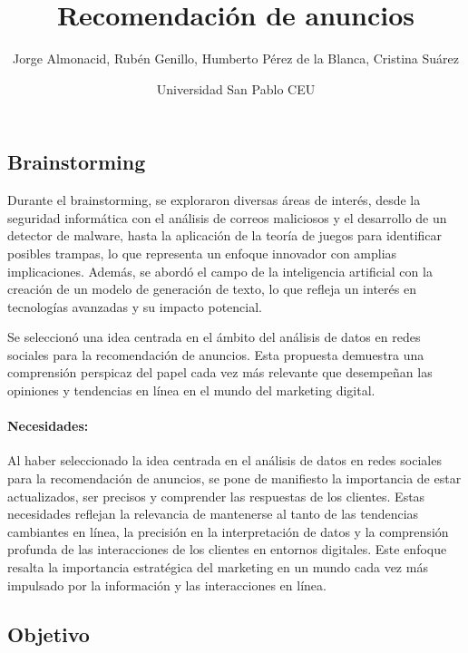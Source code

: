 \documentclass[
  letterpaper,
  DIV=11,
  numbers=noendperiod]{scrartcl}
\title{Recomendación de anuncios}
\author{Jorge Almonacid, Rubén Genillo, Humberto Pérez de la Blanca,
Cristina Suárez \and Universidad San Pablo CEU}
\date{}
\let\oldparagraph\paragraph
\renewcommand{\paragraph}[1]{\oldparagraph{#1}\mbox{}}
\renewcommand*\contentsname{Tabla de contenidos}
\newcommand\contentsname{Tabla de contenidos}
\begin{document}
\maketitle

\renewcommand*\contentsname{Indice}
{
\hypersetup{linkcolor=}
\setcounter{tocdepth}{3}
\tableofcontents
}
\newpage{}

\subsection{Brainstorming}\label{brainstorming}

Durante el brainstorming, se exploraron diversas áreas de interés, desde
la seguridad informática con el análisis de correos maliciosos y el
desarrollo de un detector de malware, hasta la aplicación de la teoría
de juegos para identificar posibles trampas, lo que representa un
enfoque innovador con amplias implicaciones. Además, se abordó el campo
de la inteligencia artificial con la creación de un modelo de generación
de texto, lo que refleja un interés en tecnologías avanzadas y su
impacto potencial.

Se seleccionó una idea centrada en el ámbito del análisis de datos en
redes sociales para la recomendación de anuncios. Esta propuesta
demuestra una comprensión perspicaz del papel cada vez más relevante que
desempeñan las opiniones y tendencias en línea en el mundo del marketing
digital.

\paragraph{Necesidades:}\label{necesidades}

Al haber seleccionado la idea centrada en el análisis de datos en redes
sociales para la recomendación de anuncios, se pone de manifiesto la
importancia de estar actualizados, ser precisos y comprender las
respuestas de los clientes. Estas necesidades reflejan la relevancia de
mantenerse al tanto de las tendencias cambiantes en línea, la precisión
en la interpretación de datos y la comprensión profunda de las
interacciones de los clientes en entornos digitales. Este enfoque
resalta la importancia estratégica del marketing en un mundo cada vez
más impulsado por la información y las interacciones en línea.

\subsection{Objetivo}\label{objetivo}
\end{document}
